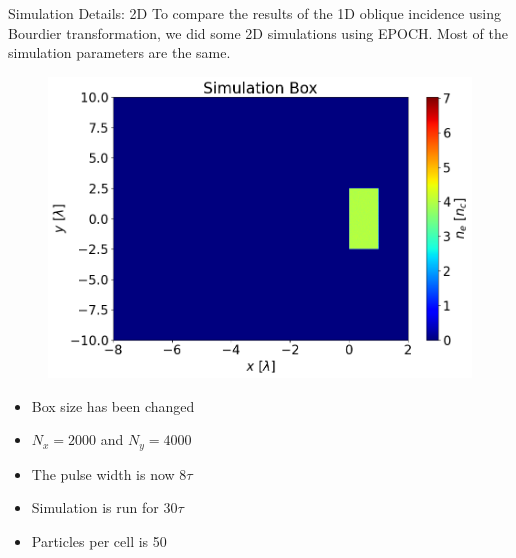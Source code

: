 \documentclass{beamer}
\begin{document}
\begin{frame}{Simulation Details: 2D}
    \small
    To compare the results of the 1D oblique incidence using Bourdier transformation, we did some 2D simulations using EPOCH. Most of the simulation parameters are the same.
    \begin{minipage}[t]{0.64\linewidth}
        \begin{figure}
            \centering
            \includegraphics[width=1.0\textwidth, height=0.62\textheight]{images/2dbox.png}
            \label{fig:2dbox}
        \end{figure}
    \end{minipage}
    \begin{minipage}[t]{0.34\linewidth}
        \begin{center}
            \begin{itemize}
                \item Box size has been changed
                \item $N_x = 2000$ and $N_y = 4000$
                \item The pulse width is now $8\tau$
                \item Simulation is run for $30\tau$
                \item Particles per cell is 50
            \end{itemize}
        \end{center}
    \end{minipage}
\end{frame}
\end{document}
